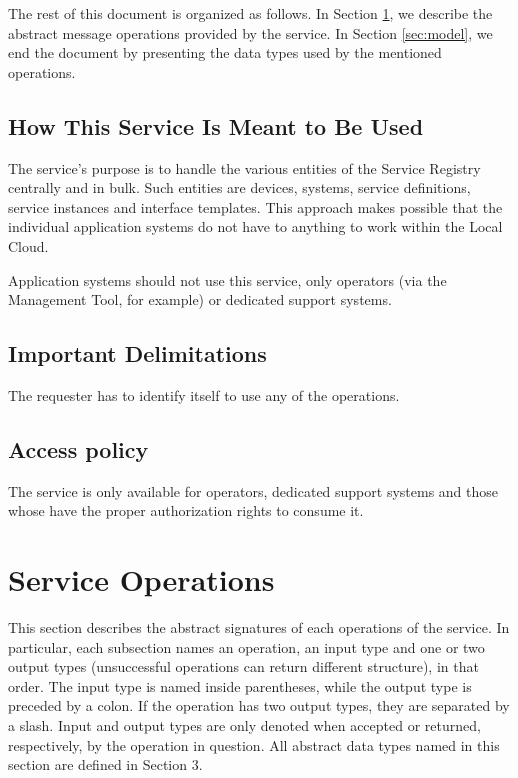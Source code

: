 \documentclass[a4paper]{arrowhead}
\begin{document}
The rest of this document is organized as follows.
In Section \ref{sec:functions}, we describe the abstract message operations provided by the service.
In Section \ref{sec:model}, we end the document by presenting the data types used by the mentioned operations.

\subsection{How This Service Is Meant to Be Used}
The service's purpose is to handle the various entities of the Service Registry centrally and in bulk. Such entities are devices, systems, service definitions, service instances and interface templates. This approach makes possible that the individual application systems do not have to anything to work within the Local Cloud.

Application systems should not use this service, only operators (via the Management Tool, for example) or dedicated support systems.

\subsection{Important Delimitations}
\label{sec:delimitations}

The requester has to identify itself to use any of the operations.

\subsection{Access policy}
\label{sec:accesspolicy}

The service is only available for operators, dedicated support systems and those whose have the proper authorization rights to consume it.

\newpage

\section{Service Operations}
\label{sec:functions}

This section describes the abstract signatures of each operations of the service. 
In particular, each subsection names an operation, an input type and one or two output types (unsuccessful operations can return different structure), in that order.
The input type is named inside parentheses, while the output type is preceded by a colon. If the operation has two output types, they are separated by a slash.
Input and output types are only denoted when accepted or returned, respectively, by the operation in question. All abstract data types named in this section are defined in Section 3.
\end{document}
